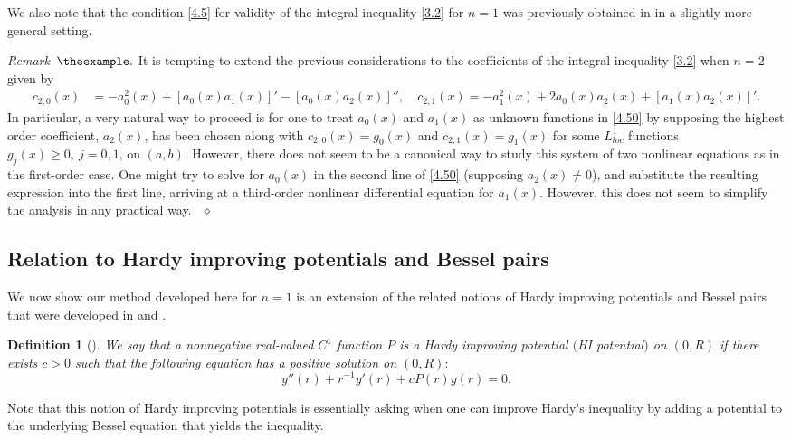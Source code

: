 \documentclass[reqno,10pt,centertags]{amsart}
\newcounter{count}
\numberwithin{equation}{section}
\newtheorem{definition}[theorem]{Definition}
\theoremstyle{remark}
\newenvironment{remark}[1][]{\refstepcounter{theorem}\par\medskip\noindent\textit{Remark~$\theexample. #1$} \rmfamily}{{\ }\hfill $\diamond$ \vspace{6pt}}%
\begin{document}
We also note that the condition \eqref{4.5} for validity of the integral inequality \eqref{3.2} for $n = 1$ was previously obtained in \cite[Thm. 3.1]{B71} in a slightly more general setting.

\begin{remark}
It is tempting to extend the previous considerations to the coefficients of the integral inequality \eqref{3.2} when $n=2$ given by
\begin{align}\label{4.50}
c_{2,0}(x)&=-a_0^2(x)+[a_0(x)a_1(x)]'-[a_0(x)a_2(x)]'',\quad
c_{2,1}(x)=-a_1^2(x)+2a_0(x)a_2(x)+[a_1(x)a_2(x)]'.
\end{align}
In particular, a very natural way to proceed is for one to treat $a_0(x)$ and $a_1(x)$ as unknown functions in \eqref{4.50} by supposing the highest order coefficient, $a_2(x)$, has been chosen along with $c_{2,0}(x)=g_0(x)$ and $c_{2,1}(x)=g_1(x)$ for some $L^1_{loc}$ functions $g_j(x)\geq0,\ j=0,1$, on $(a,b)$. However, there does not seem to be a canonical way to study this system of two nonlinear equations as in the first-order case. One might try to solve for $a_0(x)$ in the second line of \eqref{4.50} (supposing $a_2(x)\neq0$),
and substitute the resulting expression into the first line, arriving at a third-order nonlinear differential equation for $a_1(x)$. However, this does not seem to simplify the analysis in any practical way.
\end{remark}

\subsection{Relation to Hardy improving potentials and Bessel pairs}\label{s4.1.1}

We now show our method developed here for $n=1$ is an extension of the related notions of Hardy improving potentials and Bessel pairs that were developed in \cite{GM11} and \cite{GM13}.

\begin{definition}[{\cite[Def. 1.1.1]{GM13}}]\label{d4.2a}
We say that a nonnegative real-valued $C^1$ function $P$ is a Hardy improving potential $($HI potential$)$ on $(0,R)$ if there exists $c>0$ such that the following equation has a positive solution on $(0,R)$$:$
\begin{equation}\label{HI}
y''(r)+r^{-1} y'(r)+c P(r) y(r)=0.
\end{equation}
\end{definition}

Note that this notion of Hardy improving potentials is essentially asking when one can improve Hardy's inequality by adding a potential to the underlying Bessel equation that yields the inequality. 
\end{document}
